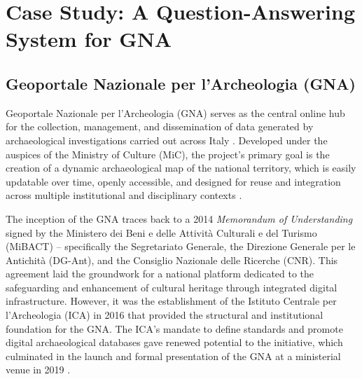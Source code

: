 \chapter{Case Study: A Question-Answering System for GNA}
\label{chap:casestudy}
\sloppy
\begin{spacing}{1.5} 

\section{Geoportale Nazionale per l’Archeologia (GNA)}
Geoportale Nazionale per l'Archeologia (GNA) \citep{mic_mic_2019} serves as the central online hub for the collection, management, and dissemination of data generated by archaeological investigations carried out across Italy \citep{acconcia_pubblicazione_2023}. Developed under the auspices of the Ministry of Culture (MiC), the project's primary goal is the creation of a dynamic archaeological map of the national territory, which is easily updatable over time, openly accessible, and designed for reuse and integration across multiple institutional and disciplinary contexts \citep{falcone_dematerializzazione_2023}.

The inception of the GNA traces back to a 2014 \textit{Memorandum of Understanding} signed by the Ministero dei Beni e delle Attività Culturali e del Turismo (MiBACT) -- specifically the Segretariato Generale, the Direzione Generale per le Antichità (DG-Ant), and the Consiglio Nazionale delle Ricerche (CNR). This agreement laid the groundwork for a national platform dedicated to the safeguarding and enhancement of cultural heritage through integrated digital infrastructure. However, it was the establishment of the Istituto Centrale per l’Archeologia (ICA) in 2016 that provided the structural and institutional foundation for the GNA. The ICA’s mandate to define standards and promote digital archaeological databases gave renewed potential to the initiative, which culminated in the launch and formal presentation of the GNA at a ministerial venue in 2019 \citep{calandra_il_2023}.


\end{spacing}
